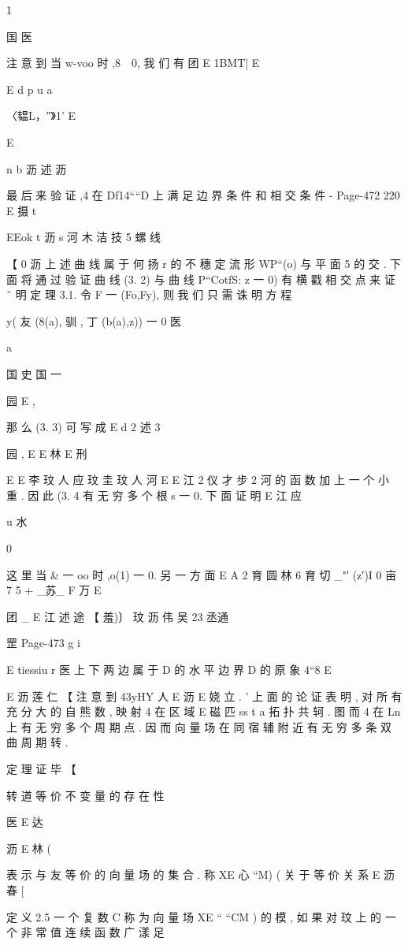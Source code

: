 {{1

国 医

注 意 到 当 w-voo 时 ,8~~0, 我 们 有
团 E
1BMT| E

E d p
u a

〈韫L，″》1' E

E

n
b 沥 述 沥

最 后 来 验 证 ,4 在 Df14““D 上 满 足 边 界 条 件 和 相 交 条 件 -
Page-472
220 E 摄 t

EEok t 沥 s 河 木 洁 技 5
螺 线

【 0 沥
上 述 曲 线 属 于 何 扬 r 的 不 穗 定 流 形 WP“(o) 与 平 面 5 的 交 . 下 面 将
通 过 验 证 曲 线 (3. 2) 与 曲 线 P“CotfS: z 一 0) 有 横 戳 相 交 点 来 证 ˇ
明 定 理 3.1. 令 F 一 (Fo,Fy), 则 我 们 只 需 诛 明 方 程

y( 友 (8(a), 驯 , 丁 (b(a),z)) 一 0 医

a

国 史 国 一

园 E ,

那 么 (3. 3) 可 写 成
E d 2 述 3

园 ,
E E 林 E 刑

E
E 李 玟 人 应 玟 圭 玟 人 河
E
E 江 2 仪 才 步 2 河
的 函 数 加 上 一 个 小 重 . 因 此 (3. 4 有 无 穷 多 个 根 s 一 0. 下 面 证 明
E 江 应

u 水

0

这 里 当 & 一 oo 时 ,o(1) 一 0. 另 一 方 面
E A 2 育 圆 林 6 育 切
_"′ (z′)I 0 亩 7 5 + _苏_ F 万 E

团 _ E 江 述 途
【 羞)〕 玟 沥 伟 吴 23 丞通

罡
Page-473
g i

E tiessiu r
医
上 下 两 边 属 于 D 的 水 平 边 界 D 的 原 象 4“8%
E

E 沥 莲 仁 【
注 意 到 43yHY 人 %
E 沥
E
娆 立 . '
上 面 的 论 证 表 明 , 对 所 有 充 分 大 的 自 熊 数 , 映 射 4 在 区 域
E 磁 匹 ss t a
拓 扑 共 轲 . 图 而 4 在 Ln 上 有 无 穷 多 个 周 期 点 . 因 而 向 量 场 在 同 宿
辅 附 近 有 无 穷 多 条 双 曲 周 期 转 .

定 理 证 毕 【

转 道 等 价 不 变 量 的 存 在 性

医
E 达

沥
E 林 (

表 示 与 友 等 价 的 向 量 场 的 集 合 . 称 XE 心 “M) ( 关 于 等 价 关 系
E 沥 春 [

定 义 2.5 一 个 复 数 C 称 为 向 量 场 XE “ “CM ) 的 模 , 如 果 对
玟
上 的 一 个 非 常 值 连 续 函 数 广 漾 足

}}
